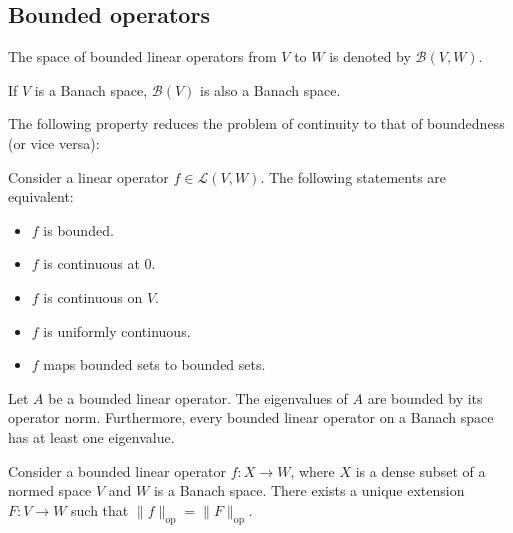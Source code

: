 \subsection{Bounded operators}

    \begin{notation}
        The space of bounded linear operators from $V$ to $W$ is denoted by $\mathcal{B}(V,W)$.
    \end{notation}
    \begin{property}
        If $V$ is a Banach space, $\mathcal{B}(V)$ is also a Banach space.
    \end{property}

    The following property reduces the problem of continuity to that of boundedness (or vice versa):
    \begin{property}\label{functional:bounded_continuous}
        Consider a linear operator $f\in\mathcal{L}(V, W)$. The following statements are equivalent:
        \begin{itemize}
            \item $f$ is bounded.
            \item $f$ is continuous at 0.
            \item $f$ is continuous on $V$.
            \item $f$ is uniformly continuous.
            \item $f$ maps bounded sets to bounded sets.
        \end{itemize}
    \end{property}

    \begin{property}
        Let $A$ be a bounded linear operator. The eigenvalues of $A$ are bounded by its operator norm. Furthermore, every bounded linear operator on a Banach space has at least one eigenvalue.
    \end{property}

    \begin{property}
        Consider a bounded linear operator $f:X\rightarrow W$, where $X$ is a dense subset of a normed space $V$ and $W$ is a Banach space. There exists a unique extension $F:V\rightarrow W$ such that $\|f\|_\text{op} = \|F\|_\text{op}$.
    \end{property}

